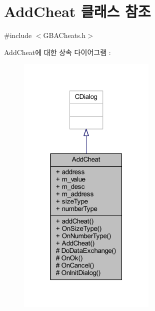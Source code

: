 \hypertarget{class_add_cheat}{}\section{Add\+Cheat 클래스 참조}
\label{class_add_cheat}


{\ttfamily \#include $<$G\+B\+A\+Cheats.\+h$>$}



Add\+Cheat에 대한 상속 다이어그램 \+: \nopagebreak
\begin{figure}[H]
\begin{center}
\leavevmode
\includegraphics[width=187pt]{class_add_cheat__inherit__graph}
\end{center}
\end{figure}


